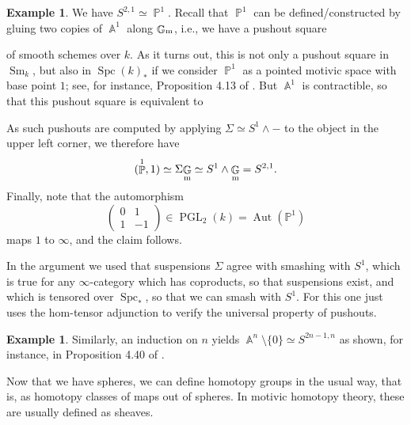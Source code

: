 \documentclass[english]{amsart}
\theoremstyle{definition}
\newtheorem{ex}[prop]{Example}
\DeclareMathOperator{\A}{\mathbb{A}}
\DeclareMathOperator{\PP}{\mathbb{P}}
\renewcommand{\P}{\PP}
\DeclareMathOperator{\G}{\mathbb{G}}
\DeclareMathOperator{\Aut}{Aut}
\DeclareMathOperator{\PGL}{PGL}
\DeclareMathOperator{\Spc}{Spc}
\DeclareMathOperator{\Sm}{Sm}
\begin{document}
\begin{ex}
We have $S^{2,1} \simeq \P^1$. Recall that $\P^1$ can be defined/constructed by gluing two copies of $\A^1$ along $\G_{\rm m}$, i.e., we have a pushout square
\begin{center}
\end{center}
of smooth schemes over $k$. As it turns out, this is not only a pushout square in $\Sm_k$, but also in $\Spc(k)_*$ if we consider $\P^1$ as a pointed motivic space with base point $1$; see, for instance, Proposition 4.13 of \cite{MR3727503}. But $\A^1$ is contractible, so that this pushout square is equivalent to
\begin{center}
\end{center}
As such pushouts are computed by applying $\Sigma \simeq S^1 \wedge -$ to the object in the upper left corner, we therefore have
$$(\P^1,1) \simeq \Sigma \!\G_{\rm m} \simeq S^1 \wedge \G_{\rm m} = S^{2,1}.$$
Finally, note that the automorphism
$$\left ( \begin{array}{cc}
0 & 1 \\

1 & -1

\end{array} \right ) \in \PGL_2(k) = \Aut(\mathbb{P}^1)$$
maps $1$ to $\infty$, and the claim follows.
\end{ex}
In the argument we used that suspensions $\Sigma$ agree with smashing with $S^1$, which is true for any $\infty$-category which has coproducts, so that suspensions exist, and which is tensored over $\Spc_*$, so that we can smash with $S^1$. For this one just uses the hom-tensor adjunction to verify the universal property of pushouts.
\begin{ex}\label{Punctured Affine Space as Sphere}
Similarly, an induction on $n$ yields $\A^n \setminus \lbrace 0 \rbrace \simeq S^{2n-1,n}$ as shown, for instance, in Proposition 4.40 of \cite{MR3727503}.
\end{ex}
Now that we have spheres, we can define homotopy groups in the usual way, that is, as homotopy classes of maps out of spheres. In motivic homotopy theory, these are usually defined as sheaves.
\end{document}
